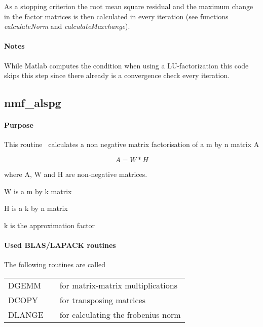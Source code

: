 \documentclass[a4paper,10pt]{scrartcl}
\begin{document}
					As a stopping criterion the root mean square residual and the maximum 
					change in the factor matrices is then calculated in every iteration (see
					functions \emph{calculateNorm} and \emph{calculateMaxchange}).\newline

			\paragraph{Notes}


					While Matlab computes the condition when using a LU-factorization this code
					skips this step since there already is a convergence check every iteration.

		\subsection{nmf\_alspg}

			\paragraph{Purpose}

					This routine~\cite{lin2007} calculates a non negative matrix factorisation of a m by n 
					matrix A\newline
					
					\begin{equation*}
						A = W * H
					\end{equation*}

 					where A, W and H are non-negative matrices.

 					W is a m by k matrix

 					H is a k by n matrix

 					k is the approximation factor


			\paragraph{Used BLAS/LAPACK routines}
	
					The following routines are called\newline

					\begin{tabular}{lcl}
						DGEMM && for matrix-matrix multiplications\\
						DCOPY && for transposing matrices\\
						DLANGE && for calculating the frobenius norm\\
					\end{tabular}
\end{document}
